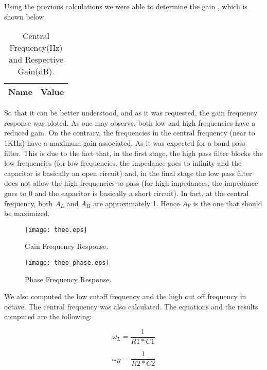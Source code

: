 Using the previous calculations we were able to determine the gain , which is shown below.

\begin{table}[ht]
  \centering
  \begin{tabular}{|l|r|}
    \hline    
    {\bf Name} & {\bf Value} \\ \hline
    
  \end{tabular}
  \caption{Central Frequency(Hz) and Respective Gain(dB).}
\end{table}

So that it can be better understood, and as it was requested, the gain frequency response was ploted. As one may observe, both low and high frequencies have a reduced gain. On the contrary, the frequencies in the central frequency (near to 1KHz) have a maximum gain associated. As it was expected for a band pass filter. This is due to the fact that, in the first stage, the high pass filter blocks the low frequencies (for low frequencies, the impedance goes to infinity and the capacitor is basically an open circuit)  and, in the final stage the low pass filter does not allow the high frequencies to pass (for high impedances, the impedance goes to 0 and the capacitor is basically a short circuit). In fact, at the central frequency, both $A_{L}$ and $A_{H}$ are approximately 1. Hence $A_{V}$ is the one that should be maximized.

\newpage

\begin{figure}[h] \centering
\texttt{[image: theo.eps]}
\caption{Gain Frequency Response.}
\label{sh}
\end{figure}

\begin{figure}[h] \centering
\texttt{[image: theo\_phase.eps]}
\caption{Phase Frequency Response.}
\label{sh2}
\end{figure}


We also computed the low cutoff frequency and the high cut off frequency in octave. The central frequency was also calculated. The equations and the results computed are the following:


\begin{equation}
\omega_{L}= \frac{1}{R1*C1}
\end{equation}

\begin{equation}
\omega_{H}= \frac{1}{R2*C2}
\end{equation}

